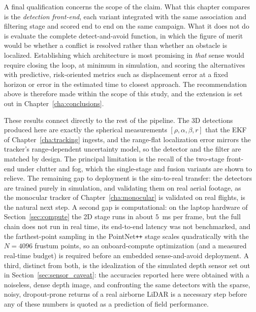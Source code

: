 A final qualification concerns the scope of the claim. What this chapter compares
is the \emph{detection front-end}, each variant integrated with the same
association and filtering stage and scored end to end on the same campaign. What
it does not do is evaluate the complete detect-and-avoid function, in which the
figure of merit would be whether a conflict is resolved rather than whether an
obstacle is localized. Establishing which architecture is most promising in
\emph{that} sense would require closing the loop, at minimum in simulation, and
scoring the alternatives with predictive, risk-oriented metrics such as
displacement error at a fixed horizon or error in the estimated time to closest
approach. The recommendation above is therefore made within the scope of this
study, and the extension is set out in Chapter~\ref{cha:conclusions}.

These results connect directly to the rest of the pipeline. The 3D detections
produced here are exactly the spherical measurements
$[\rho,\alpha,\beta,r]$ that the EKF of Chapter~\ref{cha:tracking} ingests, and
the range-flat localization error mirrors the tracker's range-dependent
uncertainty model, so the detector and the filter are matched by design. The
principal limitation is the recall of the two-stage front-end under clutter and
fog, which the single-stage and fusion variants are shown to relieve. The
remaining gap to deployment is the sim-to-real transfer: the detectors are trained
purely in simulation, and validating them on real aerial footage, as the
monocular tracker of Chapter~\ref{cha:monocular} is validated on real
flights, is the natural next step. A second gap is computational: on the laptop
hardware of Section~\ref{sec:compute} the 2D stage runs in about $5$~ms per frame,
but the full chain does not run in real time, its end-to-end latency was not
benchmarked, and the farthest-point sampling in the PointNet\texttt{++} stage
scales quadratically with the $N=4096$ frustum points, so an onboard-compute
optimization (and a measured real-time budget) is required before an embedded
sense-and-avoid deployment. A third, distinct from both, is the idealization of
the simulated depth sensor set out in Section~\ref{sec:sensor_caveat}: the
accuracies reported here were obtained with a noiseless, dense depth image, and
confronting the same detectors with the sparse, noisy, dropout-prone returns of a
real airborne LiDAR is a necessary step before any of these numbers is quoted as a
prediction of field performance.

